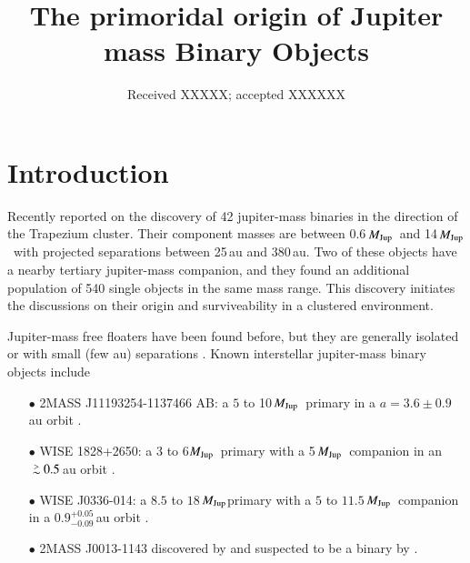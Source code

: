 \documentclass[aa]{lib/aa}
\newcommand{\MJup}{\mbox{${M}_{\rm Jup}$}}
\def\apgt{\ {\raise-.5ex\hbox{$\buildrel>\over\sim$}}\ }
\begin{document}
 

   \title{The primoridal origin of Jupiter mass Binary Objects}
   \date{Received XXXXX; accepted XXXXXX}

  \abstract
   {}
   {}
   {}
   {}
   {}

   \maketitle
   
\section{Introduction}

Recently \cite{2023arXiv231001231P} reported on the discovery of 42
jupiter-mass binaries in the direction of the Trapezium cluster.
Their component masses are between 0.6\,\MJup\, and 14\,\MJup\, with
projected separations between 25\,au and 380\,au.  Two
of these objects have a nearby tertiary jupiter-mass companion, and
they found an additional population of 540 single objects in the same
mass range. This discovery initiates the discussions on their origin
and surviveability in a clustered environment.

Jupiter-mass free floaters have been found before, but they are
generally isolated or with small (few au) separations
\citep{2021ApJS..253....7K}.  Known interstellar jupiter-mass binary
objects include\\
\begin{itemize}
\item[$\bullet$]2MASS J11193254-1137466 AB: a $5$ to 10\,\MJup\,
  primary in a $a=3.6\pm0.9$\,au orbit \citep{2017ApJ...843L...4B}.
\item[$\bullet$]WISE 1828+2650: a 3 to 6\MJup\, primary with a
  5\,\MJup\ companion in an $\apgt 0.5$\,au orbit
  \citep{2013ApJ...764..101B}.
\item[$\bullet$] WISE J0336-014: a $8.5$ to
  $18$\,\MJup primary with a $5$ to $11.5$\,\MJup\, companion in a
  $0.9^{+0.05}_{-0.09}$\,au orbit \citep{2023ApJ...947L..30C}.
\item[$\bullet$]2MASS J0013-1143 discovered by \cite{2017AJ....154..112K} and
  suspected to be a binary by \cite{2019A&A...629A.145E}.
\end{itemize}
\end{document}
